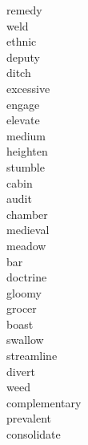 \documentclass[b5paper, 11pt]{ctexart}
\begin{document}
\begin{multicols*}{3}
\begin{description}
\item[remedy]

\item[weld]

\item[ethnic]

\item[deputy]

\item[ditch]

\item[excessive]

\item[engage]

\item[elevate]

\item[medium]

\item[heighten]

\item[stumble]

\item[cabin]

\item[audit]

\item[chamber]

\item[medieval]

\item[meadow]

\item[bar]

\item[doctrine]

\item[gloomy]

\item[grocer]

\item[boast]

\item[swallow]

\item[streamline]

\item[divert]

\item[weed]

\item[complementary]

\item[prevalent]

\item[consolidate]


\end{description}
\end{multicols*}
\end{document}
